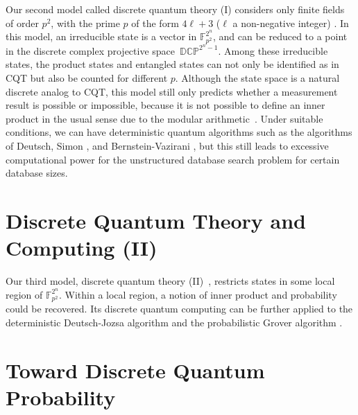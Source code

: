 \documentclass[twoside]{iuphd}
\begin{document}
Our second model called discrete quantum theory (I) considers only
finite fields of order $p^{2}$, with the prime $p$ of the form $4\ell+3$
($\ell$ a non-negative integer) \cite{geometry2013,DQT2014}. In
this model, an irreducible state is a vector in $\mathbb{F}_{p^{2}}^{2^{n}}$,
and can be reduced to a point in the discrete complex projective space~$\mathbb{DCP}^{2^{n}-1}$.
Among these irreducible states, the product states and entangled states
can not only be identified as in CQT but also be counted for different
$p$. Although the state space is a natural discrete analog to CQT,
this model still only predicts whether a measurement result is possible
or impossible, because it is not possible to define an inner product
in the usual sense due to the modular arithmetic~\cite{grove2002classical}.
Under suitable conditions, we can have deterministic quantum algorithms
such as the algorithms of Deutsch, Simon \cite{Simon:1994:PQC:1398518.1399019,Mermin2007,Jaeger2007},
and Bernstein-Vazirani \cite{Bernstein:1993:QCT:167088.167097,Mermin2007},
but this still leads to excessive computational power for the unstructured
database search problem for certain database sizes. 

\section{Discrete Quantum Theory and Computing (II)}

Our third model, discrete quantum theory (II)~\cite{DQT2014}, restricts
states in some local region of $\mathbb{F}_{p^{2}}^{2^{n}}$. Within
a local region, a notion of inner product and probability could be
recovered. Its discrete quantum computing can be further applied to
the deterministic Deutsch-Jozsa algorithm \cite{DeutschJozsa1992,Jaeger2007}
and the probabilistic Grover algorithm \cite{Grover:1996:FQM:237814.237866,Mermin2007,Jaeger2007}.

\section{Toward Discrete Quantum Probability}
\end{document}
